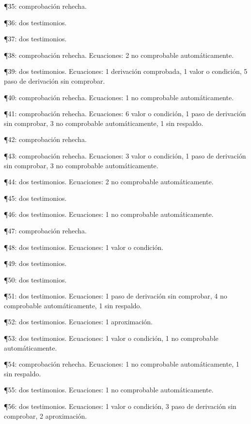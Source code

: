 \documentclass[10pt,openany]{book}
\begin{document}
\noindent ¶35: comprobación rehecha.\par
\noindent ¶36: dos testimonios.\par
\noindent ¶37: dos testimonios.\par
\noindent ¶38: comprobación rehecha. Ecuaciones: 2 no comprobable automáticamente.\par
\noindent ¶39: dos testimonios. Ecuaciones: 1 derivación comprobada, 1 valor o condición, 5 paso de derivación sin comprobar.\par
\noindent ¶40: comprobación rehecha. Ecuaciones: 1 no comprobable automáticamente.\par
\noindent ¶41: comprobación rehecha. Ecuaciones: 6 valor o condición, 1 paso de derivación sin comprobar, 3 no comprobable automáticamente, 1 sin respaldo.\par
\noindent ¶42: comprobación rehecha.\par
\noindent ¶43: comprobación rehecha. Ecuaciones: 3 valor o condición, 1 paso de derivación sin comprobar, 3 no comprobable automáticamente.\par
\noindent ¶44: dos testimonios. Ecuaciones: 2 no comprobable automáticamente.\par
\noindent ¶45: dos testimonios.\par
\noindent ¶46: dos testimonios. Ecuaciones: 1 no comprobable automáticamente.\par
\noindent ¶47: comprobación rehecha.\par
\noindent ¶48: dos testimonios. Ecuaciones: 1 valor o condición.\par
\noindent ¶49: dos testimonios.\par
\noindent ¶50: dos testimonios.\par
\noindent ¶51: dos testimonios. Ecuaciones: 1 paso de derivación sin comprobar, 4 no comprobable automáticamente, 1 sin respaldo.\par
\noindent ¶52: dos testimonios. Ecuaciones: 1 aproximación.\par
\noindent ¶53: dos testimonios. Ecuaciones: 1 valor o condición, 1 no comprobable automáticamente.\par
\noindent ¶54: comprobación rehecha. Ecuaciones: 1 no comprobable automáticamente, 1 sin respaldo.\par
\noindent ¶55: dos testimonios. Ecuaciones: 1 no comprobable automáticamente.\par
\noindent ¶56: dos testimonios. Ecuaciones: 1 valor o condición, 3 paso de derivación sin comprobar, 2 aproximación.\par
\end{document}
